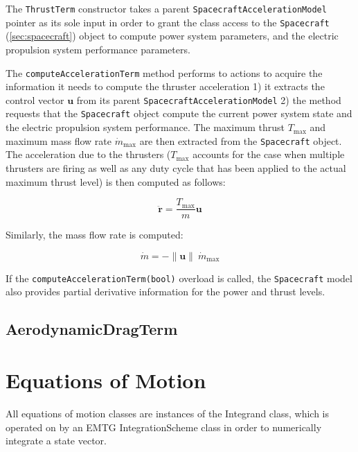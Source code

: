 The \texttt{ThrustTerm} constructor takes a parent \texttt{SpacecraftAccelerationModel} pointer as its sole input in order to grant the class access to the \texttt{Spacecraft} (\ref{sec:spacecraft}) object to compute power system parameters, and the electric propulsion system performance parameters.

The \texttt{computeAccelerationTerm} method performs to actions to acquire the information it needs to compute the thruster acceleration 1) it extracts the control vector $\mathbf{u}$ from its parent \texttt{SpacecraftAccelerationModel} 2) the method requests that the \texttt{Spacecraft} object compute the current power system state and the electric propulsion system performance. The maximum thrust $T_{\text{max}}$ and maximum mass flow rate $\dot{m}_{\text{max}}$ are then extracted from the \texttt{Spacecraft} object. The acceleration due to the thrusters ($T_{\text{max}}$ accounts for the case when multiple thrusters are firing as well as any duty cycle that has been applied to the actual maximum thrust level) is then computed as follows:

\begin{equation}
\ddot{\mathbf{r}} = \frac{T_{\text{max}}}{m}\mathbf{u} \label{eq:EOM_thruster}
\end{equation}

\noindent Similarly, the mass flow rate is computed:

\begin{equation}
\dot{m} = - \|\mathbf{u}\| ~ \dot{m}_{\text{max}} \label{eq:EOM_m}
\end{equation}

If the \texttt{computeAccelerationTerm(bool)} overload is called, the \texttt{Spacecraft} model also provides partial derivative information for the power and thrust levels.

\subsection{AerodynamicDragTerm}
\label{sec:AerodynamicDragTerm}




\section{Equations of Motion}
\label{sec:Equations of Motion}

All equations of motion classes are instances of the Integrand class, which is operated on by an EMTG IntegrationScheme class in order to numerically integrate a state vector.

